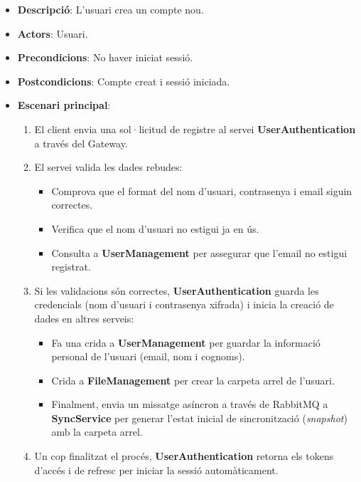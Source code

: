 \begin{itemize}
    \item \textbf{Descripció}: L'usuari crea un compte nou.
    \item \textbf{Actors}: Usuari.
    \item \textbf{Precondicions}: No haver iniciat sessió.
    \item \textbf{Postcondicions}: Compte creat i sessió iniciada.
    \item \textbf{Escenari principal}:
    \begin{enumerate}
        \item El client envia una sol·licitud de registre al servei \textbf{UserAuthentication} a través del Gateway.
        \item El servei valida les dades rebudes:
        \begin{itemize}
            \item Comprova que el format del nom d'usuari, contrasenya i email siguin correctes.
            \item Verifica que el nom d'usuari no estigui ja en ús.
            \item Consulta a \textbf{UserManagement} per assegurar que l'email no estigui registrat.
        \end{itemize}
        \item Si les validacions són correctes, \textbf{UserAuthentication} guarda les credencials (nom d'usuari i contrasenya xifrada) i inicia la creació de dades en altres serveis:
        \begin{itemize}
            \item Fa una crida a \textbf{UserManagement} per guardar la informació personal de l'usuari (email, nom i cognoms).
            \item Crida a \textbf{FileManagement} per crear la carpeta arrel de l'usuari.
            \item Finalment, envia un missatge asíncron a través de RabbitMQ a \textbf{SyncService} per generar l'estat inicial de sincronització (\emph{snapshot}) amb la carpeta arrel.
        \end{itemize}
        \item Un cop finalitzat el procés, \textbf{UserAuthentication} retorna els tokens d'accés i de refresc per iniciar la sessió automàticament.
    \end{enumerate}
\end{itemize}

